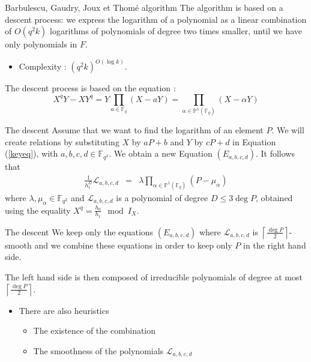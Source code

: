 \documentclass[xcolor=x11names,compress]{beamer}
\theoremstyle{break}
\theoremstyle{sc}
\theoremstyle{definition}
\theoremstyle{remark}
\begin{document}
\begin{frame}{Barbulescu, Gaudry, Joux et Thomé algorithm}
The algorithm is based on a descent process: we express the logarithm of a
polynomial as a linear combination of $O(q^2k)$ logarithms of polynomials of degree two
times smaller, until we have only polynomials in $F$.
    \begin{itemize}
      \item Complexity : $(q^2k)^{O(\log k)}$.
    \end{itemize}
    The descent process is based on the equation :
 \begin{equation}
   X^qY - XY^q = Y\prod_{a\in\mathbb{F}_q}(X - aY) =
   \prod_{\alpha\in\mathbb{P}^1(\mathbb{F}_q)}(X-\alpha Y)
   \label{keyeq}
 \end{equation}
 
\end{frame}

\begin{frame}{The descent}
  Assume that we want to find the logarithm of an element $P$. We will create
  relations by substituting $X$ by $aP + b$ and $Y$ by $cP + d$ in Equation
  (\ref{keyeq}), with $a, b, c, d \in \mathbb{F}_{q^2}$. We obtain a new
  Equation $(E_{a, b, c, d})$. It follows that
  \begin{eqnarray*}
    \frac{1}{h_1^D}\mathcal L_{a, b, c, d} &=& \lambda
    \prod_{\alpha\in\mathbb{P}^1(\mathbb{F}_q)}(P-\mu_\alpha)
  \end{eqnarray*}
  where $\lambda, \mu_\alpha\in\mathbb{F}_{q^2}$ and $\mathcal L_{a, b, c,
  d}$ is a polynomial of degree $D\leq 3\deg P$, obtained using the equality $X^q =
  \frac{h_0}{h_1}\mod I_X$.
  
\end{frame}

\begin{frame}{The descent}
  We keep only the equations $(E_{a, b, c, d})$ where
  $\mathcal L_{a, b, c, d}$ is
  $\left\lceil \frac{\deg P}{2}\right\rceil$-smooth and we combine these equations
  in order to keep only $P$ in the right hand side.

  The left hand side is then composed of irreducible polynomials 
  of degree at most $\left\lceil \frac{\deg P}{2}\right\rceil$.

  \begin{itemize}
    \item There are also heuristics
      \begin{itemize}
        \item The existence of the combination
        \item The smoothness of the polynomials $\mathcal L_{a, b, c, d}$
      \end{itemize}
  \end{itemize}
\end{frame}
\end{document}
